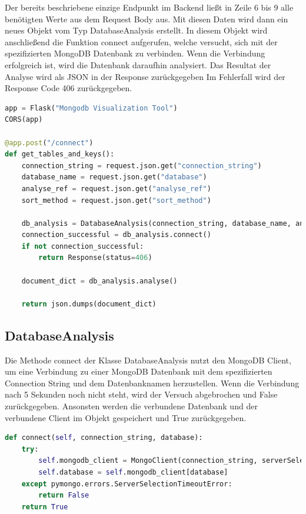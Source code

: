 Der bereits beschriebene einzige Endpunkt im Backend ließt in Zeile 6 bis 9 alle benötigten Werte aus dem Request Body aus.
Mit diesen Daten wird dann ein neues Objekt vom Typ DatabaseAnalysis erstellt.
In diesem Objekt wird anschließend die Funktion connect aufgerufen, welche versucht, sich mit der spezifizierten MongoDB Datenbank zu verbinden.
Wenn die Verbindung erfolgreich ist, wird die Datenbank daraufhin analysiert.
Das Resultat der Analyse wird als JSON in der Response zurückgegeben
Im Fehlerfall wird der Response Code 406 zurückgegeben.

\begin{lstlisting}[language=python, caption={app.py},label={lst:backend_app}]
app = Flask("Mongodb Visualization Tool")
CORS(app)

@app.post("/connect")
def get_tables_and_keys():
    connection_string = request.json.get("connection_string")
    database_name = request.json.get("database")
    analyse_ref = request.json.get("analyse_ref")
    sort_method = request.json.get("sort_method")

    db_analysis = DatabaseAnalysis(connection_string, database_name, analyse_ref, sort_method)
    connection_successful = db_analysis.connect()
    if not connection_successful:
        return Response(status=406)

    document_dict = db_analysis.analyse()

    return json.dumps(document_dict)
\end{lstlisting}

\subsection{DatabaseAnalysis}
\label{sub:ba_database_analysis}

Die Methode connect der Klasse DatabaseAnalysis nutzt  den MongoDB Client, um eine Verbindung zu einer MongoDB Datenbank mit dem spezifizierten Connection String und dem Datenbanknamen herzustellen.
Wenn die Verbindung nach 5 Sekunden noch nicht steht, wird der Versuch abgebrochen und False zurückgegeben.
Ansonsten werden die verbundene Datenbank und der verbundene Client im Objekt gespeichert und True zurückgegeben.

\begin{lstlisting}[language=python, caption={DatabaseAnalysis.connect},label={lst:backend_connect}]
def connect(self, connection_string, database):
    try:
        self.mongodb_client = MongoClient(connection_string, serverSelectionTimeoutMS=5000)
        self.database = self.mongodb_client[database]
    except pymongo.errors.ServerSelectionTimeoutError:
        return False
    return True
\end{lstlisting}

